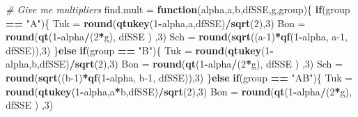 \documentclass[
]{article}
\newenvironment{Shaded}{\begin{snugshade}}{\end{snugshade}}
\newcommand{\CommentTok}[1]{\textcolor[rgb]{0.56,0.35,0.01}{\textit{#1}}}
\newcommand{\ControlFlowTok}[1]{\textcolor[rgb]{0.13,0.29,0.53}{\textbf{#1}}}
\newcommand{\DecValTok}[1]{\textcolor[rgb]{0.00,0.00,0.81}{#1}}
\newcommand{\FunctionTok}[1]{\textcolor[rgb]{0.13,0.29,0.53}{\textbf{#1}}}
\newcommand{\NormalTok}[1]{#1}
\newcommand{\OtherTok}[1]{\textcolor[rgb]{0.56,0.35,0.01}{#1}}
\newcommand{\SpecialCharTok}[1]{\textcolor[rgb]{0.81,0.36,0.00}{\textbf{#1}}}
\newcommand{\StringTok}[1]{\textcolor[rgb]{0.31,0.60,0.02}{#1}}
\begin{document}
\begin{Shaded}
\begin{Highlighting}[]
\CommentTok{\# Give me multipliers}
\NormalTok{find.mult }\OtherTok{=} \ControlFlowTok{function}\NormalTok{(alpha,a,b,dfSSE,g,group)\{}
  \ControlFlowTok{if}\NormalTok{(group }\SpecialCharTok{==} \StringTok{"A"}\NormalTok{)\{}
\NormalTok{  Tuk }\OtherTok{=} \FunctionTok{round}\NormalTok{(}\FunctionTok{qtukey}\NormalTok{(}\DecValTok{1}\SpecialCharTok{{-}}\NormalTok{alpha,a,dfSSE)}\SpecialCharTok{/}\FunctionTok{sqrt}\NormalTok{(}\DecValTok{2}\NormalTok{),}\DecValTok{3}\NormalTok{)}
\NormalTok{  Bon }\OtherTok{=} \FunctionTok{round}\NormalTok{(}\FunctionTok{qt}\NormalTok{(}\DecValTok{1}\SpecialCharTok{{-}}\NormalTok{alpha}\SpecialCharTok{/}\NormalTok{(}\DecValTok{2}\SpecialCharTok{*}\NormalTok{g), dfSSE ) ,}\DecValTok{3}\NormalTok{)}
\NormalTok{  Sch }\OtherTok{=} \FunctionTok{round}\NormalTok{(}\FunctionTok{sqrt}\NormalTok{((a}\DecValTok{{-}1}\NormalTok{)}\SpecialCharTok{*}\FunctionTok{qf}\NormalTok{(}\DecValTok{1}\SpecialCharTok{{-}}\NormalTok{alpha, a}\DecValTok{{-}1}\NormalTok{, dfSSE)),}\DecValTok{3}\NormalTok{)}
\NormalTok{  \}}\ControlFlowTok{else} \ControlFlowTok{if}\NormalTok{(group }\SpecialCharTok{==} \StringTok{"B"}\NormalTok{)\{}
\NormalTok{  Tuk }\OtherTok{=} \FunctionTok{round}\NormalTok{(}\FunctionTok{qtukey}\NormalTok{(}\DecValTok{1}\SpecialCharTok{{-}}\NormalTok{alpha,b,dfSSE)}\SpecialCharTok{/}\FunctionTok{sqrt}\NormalTok{(}\DecValTok{2}\NormalTok{),}\DecValTok{3}\NormalTok{)}
\NormalTok{  Bon }\OtherTok{=} \FunctionTok{round}\NormalTok{(}\FunctionTok{qt}\NormalTok{(}\DecValTok{1}\SpecialCharTok{{-}}\NormalTok{alpha}\SpecialCharTok{/}\NormalTok{(}\DecValTok{2}\SpecialCharTok{*}\NormalTok{g), dfSSE ) ,}\DecValTok{3}\NormalTok{)}
\NormalTok{  Sch }\OtherTok{=} \FunctionTok{round}\NormalTok{(}\FunctionTok{sqrt}\NormalTok{((b}\DecValTok{{-}1}\NormalTok{)}\SpecialCharTok{*}\FunctionTok{qf}\NormalTok{(}\DecValTok{1}\SpecialCharTok{{-}}\NormalTok{alpha, b}\DecValTok{{-}1}\NormalTok{, dfSSE)),}\DecValTok{3}\NormalTok{)}
\NormalTok{  \}}\ControlFlowTok{else} \ControlFlowTok{if}\NormalTok{(group }\SpecialCharTok{==} \StringTok{"AB"}\NormalTok{)\{}
\NormalTok{  Tuk }\OtherTok{=} \FunctionTok{round}\NormalTok{(}\FunctionTok{qtukey}\NormalTok{(}\DecValTok{1}\SpecialCharTok{{-}}\NormalTok{alpha,a}\SpecialCharTok{*}\NormalTok{b,dfSSE)}\SpecialCharTok{/}\FunctionTok{sqrt}\NormalTok{(}\DecValTok{2}\NormalTok{),}\DecValTok{3}\NormalTok{)}
\NormalTok{  Bon }\OtherTok{=} \FunctionTok{round}\NormalTok{(}\FunctionTok{qt}\NormalTok{(}\DecValTok{1}\SpecialCharTok{{-}}\NormalTok{alpha}\SpecialCharTok{/}\NormalTok{(}\DecValTok{2}\SpecialCharTok{*}\NormalTok{g), dfSSE ) ,}\DecValTok{3}\NormalTok{)}

\end{Highlighting}
\end{Shaded}
\end{document}
